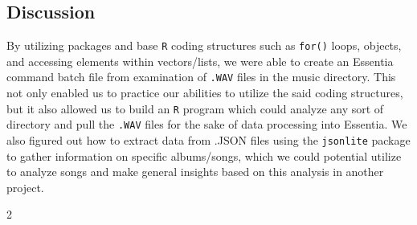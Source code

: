 \documentclass{article}\usepackage[]{graphicx}\usepackage[]{xcolor}
\begin{document}
\begin{multicols}{2}
\section{Discussion}
By utilizing packages and base \texttt{R} coding structures such as \texttt{for()} loops, objects, and accessing
elements within vectors/lists, we were able to create an Essentia command batch file from examination of 
\texttt{.WAV} files in the music directory. This not only enabled us to practice our abilities to utilize the said
coding structures, but it also allowed us to build an \texttt{R} program which could analyze any sort of directory
and pull the \texttt{.WAV} files for the sake of data processing into Essentia. We also figured out how to extract
data from .JSON files using the \texttt{jsonlite} package to gather information on specific albums/songs, which we could potential utilize to analyze songs and make general insights based on this analysis in another project.

\begin{footnotesize}

\end{footnotesize}






 
\end{multicols}{2}
\end{document}
